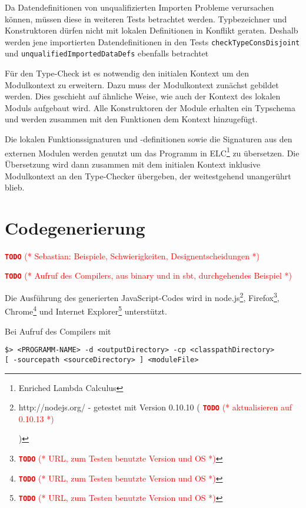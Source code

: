 \documentclass[runningheads]{llncs}
\newcommand{\TODO}[1]{ \textcolor{red}{\textbf{\texttt{\large{TODO}}} (* #1 *)}\par}
\begin{document}
Da Datendefinitionen von unqualifizierten Importen Probleme verursachen können, müssen diese in weiteren Tests betrachtet werden. Typbezeichner und Konstruktoren dürfen nicht mit lokalen Definitionen in Konflikt geraten. Deshalb werden jene importierten Datendefinitionen in den Tests \verb|checkTypeConsDisjoint| und \verb|unqualifiedImportedDataDefs| ebenfalls betrachtet

Für den Type-Check ist es notwendig den initialen Kontext um den Modulkontext zu erweitern. Dazu muss der Modulkontext zunächst gebildet werden. Dies geschieht auf ähnliche Weise, wie auch der Kontext des lokalen Moduls aufgebaut wird. Alle Konstruktoren der Module erhalten ein Typschema und werden zusammen mit den Funktionen dem Kontext hinzugefügt.

Die lokalen Funktionssignaturen und -definitionen sowie die Signaturen aus den externen Modulen werden genutzt um das Programm in ELC\footnote{Enriched Lambda Calculus} zu übersetzen. Die Übersetzung wird dann zusammen mit dem initialen Kontext inklusive Modulkontext an den Type-Checker übergeben, der weitestgehend unangerührt blieb.

\section{Codegenerierung}\label{sec:codegen}

\TODO{Sebastian: Beispiele, Schwierigkeiten, Designentscheidungen}

\TODO{Aufruf des Compilers, aus binary und in sbt, durchgehendes Beispiel}

Die Ausführung des generierten JavaScript-Codes wird in
node.js\footnote{http://nodejs.org/ - getestet mit Version 0.10.10
(\TODO{aktualisieren auf 0.10.13})},
Firefox\footnote{\TODO{URL, zum Testen benutzte Version und OS}},
Chrome\footnote{\TODO{URL, zum Testen benutzte Version und OS}} und
Internet Explorer\footnote{\TODO{URL, zum Testen benutzte Version und OS}}
unterstützt.

Bei Aufruf des Compilers mit
\begin{lstlisting}
$> <PROGRAMM-NAME> -d <outputDirectory> -cp <classpathDirectory>
[ -sourcepath <sourceDirectory> ] <moduleFile>
\end{lstlisting}
\end{document}
